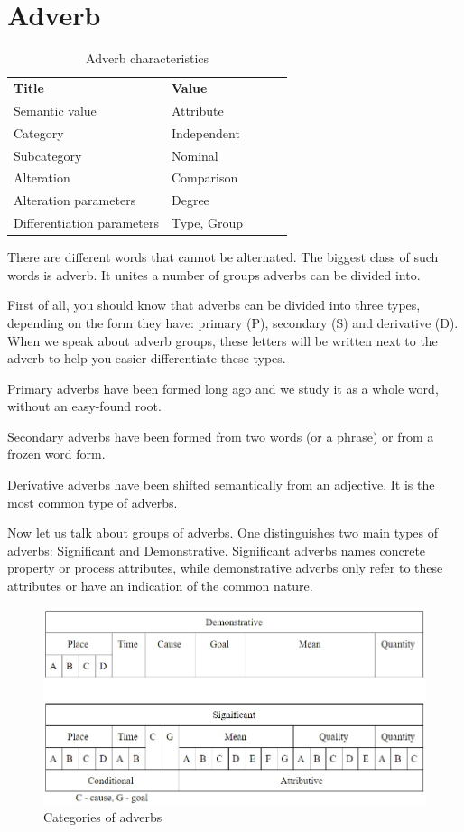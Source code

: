 \section{Adverb}

\begin{table}[h]
	\caption{Adverb characteristics}
	\begin{tabular}{lllll}
		\textbf{Title}              & \textbf{Value}      \\
		Semantic value              & Attribute           \\
		Category                    & Independent         \\
		Subcategory                 & Nominal             \\
		Alteration                  & Comparison          \\
		Alteration parameters       & Degree              \\
		Differentiation parameters  & Type, Group
	\end{tabular}
\end{table}

There are different words that cannot be alternated. The biggest class of such words is adverb. It unites a number of groups adverbs can be divided into.

First of all, you should know that adverbs can be divided into three types, depending on the form they have: primary (P), secondary (S) and derivative (D). When we speak about adverb groups, these letters will be written next to the adverb to help you easier differentiate these types.

Primary adverbs have been formed long ago and we study it as a whole word, without an easy-found root.

Secondary adverbs have been formed from two words (or a phrase) or from a frozen word form. 

Derivative adverbs have been shifted semantically from an adjective. It is the most common type of adverbs.

Now let us talk about groups of adverbs. One distinguishes two main types of adverbs: Significant and Demonstrative. Significant adverbs names concrete property or process attributes, while demonstrative adverbs only refer to these attributes or have an indication of the common nature.

\begin{figure}
	\includegraphics[width=\linewidth]{./sources/adverbs.jpg}
	\caption{Categories of adverbs}
	\label{fig:adverbs}
\end{figure}

